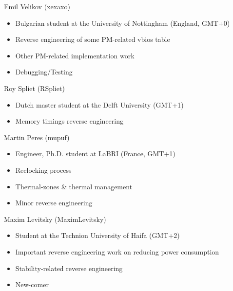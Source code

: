 \documentclass[11pt,english,compress]{beamer}
\begin{document}
		\begin{frame}
			\begin{block}{Emil Velikov (xexaxo)}
				\begin{itemize}
					\item Bulgarian student at the University of Nottingham (England, GMT+0)
					\item Reverse engineering of some PM-related vbios table
					\item Other PM-related implementation work
					\item Debugging/Testing
				\end{itemize}
			\end{block}

			\begin{block}{Roy Spliet (RSpliet)}
				\begin{itemize}
					\item Dutch master student at the Delft University (GMT+1)
					\item Memory timings reverse engineering
				\end{itemize}
			\end{block}
		\end{frame}

		\begin{frame}
			\begin{block}{Martin Peres (mupuf)}
				\begin{itemize}
					\item Engineer, Ph.D. student at LaBRI (France, GMT+1)
					\item Reclocking process
					\item Thermal-zones \& thermal management
					\item Minor reverse engineering
				\end{itemize}
			\end{block}

			\begin{block}{Maxim Levitsky (MaximLevitsky)}
				\begin{itemize}
					\item Student at the Technion University of Haifa (GMT+2)
					\item Important reverse engineering work on reducing power consumption
					\item Stability-related reverse engineering
					\item New-comer
				\end{itemize}
			\end{block}
		\end{frame}
\end{document}

